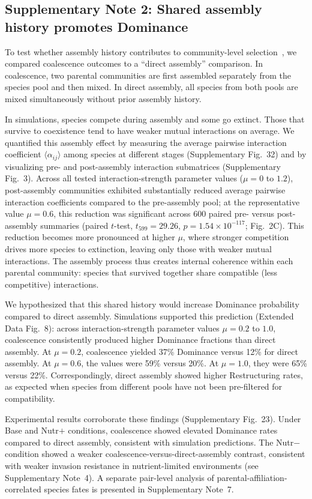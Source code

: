 \subsection*{Supplementary Note 2: Shared assembly history promotes Dominance}
\label{sec:suppl:note2}

To test whether assembly history contributes to community-level selection~\citep{Gilpin1994,Debray2022,Tikhonov2016,DiazColunga2022}, we compared coalescence outcomes to a ``direct assembly'' comparison. In coalescence, two parental communities are first assembled separately from the species pool and then mixed. In direct assembly, all species from both pools are mixed simultaneously without prior assembly history.

In simulations, species compete during assembly and some go extinct. Those that survive to coexistence tend to have weaker mutual interactions on average. We quantified this assembly effect by measuring the average pairwise interaction coefficient $\langle \alpha_{ij} \rangle$ among species at different stages (Supplementary Fig.~32) and by visualizing pre- and post-assembly interaction submatrices (Supplementary Fig.~3). Across all tested interaction-strength parameter values ($\mu = 0$ to $1.2$), post-assembly communities exhibited substantially reduced average pairwise interaction coefficients compared to the pre-assembly pool; at the representative value $\mu = 0.6$, this reduction was significant across 600 paired pre- versus post-assembly summaries (paired $t$-test, $t_{599} = 29.26$, $p = 1.54 \times 10^{-117}$; Fig.~2C). This reduction becomes more pronounced at higher $\mu$, where stronger competition drives more species to extinction, leaving only those with weaker mutual interactions. The assembly process thus creates internal coherence within each parental community: species that survived together share compatible (less competitive) interactions.

We hypothesized that this shared history would increase Dominance probability compared to direct assembly. Simulations supported this prediction (Extended Data Fig.~8): across interaction-strength parameter values $\mu = 0.2$ to $1.0$, coalescence consistently produced higher Dominance fractions than direct assembly. At $\mu = 0.2$, coalescence yielded 37\% Dominance versus 12\% for direct assembly. At $\mu = 0.6$, the values were 59\% versus 20\%. At $\mu = 1.0$, they were 65\% versus 22\%. Correspondingly, direct assembly showed higher Restructuring rates, as expected when species from different pools have not been pre-filtered for compatibility.

Experimental results corroborate these findings (Supplementary Fig.~23). Under Base and Nutr$+$ conditions, coalescence showed elevated Dominance rates compared to direct assembly, consistent with simulation predictions. The Nutr$-$ condition showed a weaker coalescence-versus-direct-assembly contrast, consistent with weaker invasion resistance in nutrient-limited environments (see Supplementary Note~4). A separate pair-level analysis of parental-affiliation-correlated species fates is presented in Supplementary Note~7.
